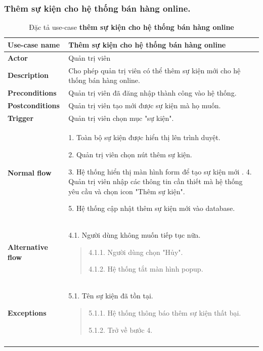 \subsubsection{Thêm sự kiện cho hệ thống bán hàng online.}
\begin{longtable}{| p{} | p{} |} 
\hline
\textbf{Use-case name} 
& 
Thêm sự kiện cho hệ thống bán hàng online
\\
\hline
\textbf{Actor} 
& 
Quản trị viên
\\
\hline
\textbf{Description} 
& 
Cho phép quản trị viên có thể thêm sự kiện mới cho hệ thống bán hàng online.
\\
\hline
\textbf{Preconditions} 
&
Quản trị viên đã đăng nhập thành công vào hệ thống.
\\
\hline
\textbf{Postconditions} 
& 
Quản trị viên tạo mới được sự kiện mà họ muốn.
\\
\hline
\textbf{Trigger} 
& 
Quản trị viên chọn mục "sự kiện".
\\
\hline
\begin{flushleft}
\textbf{Normal flow}
\end{flushleft}
& 
    1. Toàn bộ sự kiện được hiển thị lên trình duyệt.
    
    2. Quản trị viên chọn nút thêm sự kiện.
    
    3. Hệ thống hiển thị màn hình form để tạo sự kiện mới
    .
    4. Quản trị viên nhập các thông tin cần thiết mà hệ thống yêu cầu và chọn icon "Thêm sự kiện".
    
    5. Hệ thống cập nhật thêm sự kiện mới vào database.
\\
\hline
\begin{flushleft}
\textbf{Alternative flow}
\end{flushleft}
& 
4.1. Người dùng không muốn tiếp tục nữa.
    \begin{quote}
        4.1.1. Người dùng chọn "Hủy".
        
        4.1.2. Hệ thống tắt màn hình popup.
    \end{quote}
\\
\hline
\begin{flushleft}
\textbf{Exceptions} 
\end{flushleft}
&
5.1. Tên sự kiện đã tồn tại.
    \begin{quote}
        5.1.1. Hệ thống thông báo thêm sự kiện thất bại.
        
    5.1.2. Trở về bước 4.
    \end{quote}

\\
\hline
\caption{Đặc tả use-case \textbf{thêm sự kiện cho hệ thống bán hàng online}}
\end{longtable}
            
